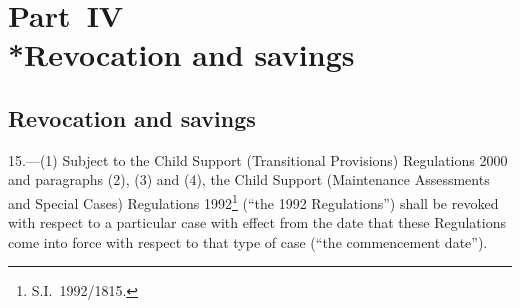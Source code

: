 \documentclass[12pt,a4paper]{article}
\begin{document}
\section[Part~IV --- Revocation and savings]{Part~IV\\*Revocation and savings}

\renewcommand\parthead{--- Part~IV}

\subsection[15. Revocation and savings]{Revocation and savings}

15.---(1)  Subject to 
the Child Support (Transitional Provisions) Regulations 2000 and %
paragraphs (2), (3) and (4), the Child Support (Maintenance Assessments and Special Cases) Regulations 1992\footnote{S.I.~1992/1815.} (“the 1992 Regulations”) shall be revoked with respect to a particular case with effect from the date that these Regulations come into force with respect to that type of case (“the commencement date”).
\end{document}
